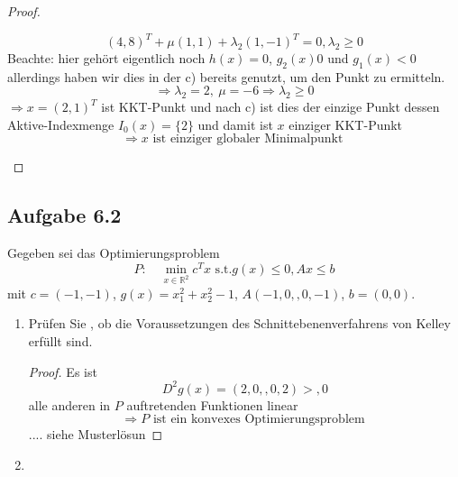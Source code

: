 \documentclass[12pt]{extreport} %
\newcommand{\R}{\mathbb{R}}
\theoremstyle{named}
\theoremstyle{nnamed}
\theoremstyle{itshape}
\theoremstyle{normal}
\begin{document}
\begin{enumerate}
\begin{proof}
\begin{itemize}
					$$ (4, 8)^T + \mu (1, 1) + \lambda_2 (1, -1)^T = 0, \lambda_2 \geq 0 $$
					Beachte: hier gehört eigentlich noch $h(x) = 0$, $g_2(x) 0$ und $g_1(x)  < 0$ allerdings haben wir dies in der c) bereits genutzt, um den Punkt zu ermitteln.
					$$ \Rightarrow \lambda_2 = 2, ~ \mu = -6 \Rightarrow \lambda_2 \geq 0 $$
					$\Rightarrow x = (2, 1)^T$ ist KKT-Punkt und nach c) ist dies der einzige Punkt dessen Aktive-Indexmenge $I_0(x) = \{ 2 \}$ und damit ist $x$ einziger KKT-Punkt
					$$ \Rightarrow x \text{ ist einziger globaler Minimalpunkt } $$
			\end{itemize}
		\end{proof}
\end{enumerate}

\subsection*{Aufgabe 6.2}

Gegeben sei das Optimierungsproblem 
$$ P: \quad \min_{x \in \R^2} c^T x \text{ s.t.} g(x) \leq 0, Ax \leq b $$
mit $c = (-1, -1)$, $g(x) = x_1^2+ x_2^2 - 1$, $A(-1, 0,, 0, -1)$, $b = (0, 0)$.

\begin{enumerate}
	\item Prüfen Sie , ob die Voraussetzungen des Schnittebenenverfahrens von Kelley erfüllt sind.
		\begin{proof}
			Es ist
			$$ D^2 g(x) = (2, 0,,0, 2) > ,0 $$
			alle anderen in $P$ auftretenden Funktionen linear 
			$$\Rightarrow P \text{ ist ein konvexes Optimierungsproblem } $$
			.... siehe Musterlösun
		\end{proof}
	\item 
\end{enumerate}

\end{document}
